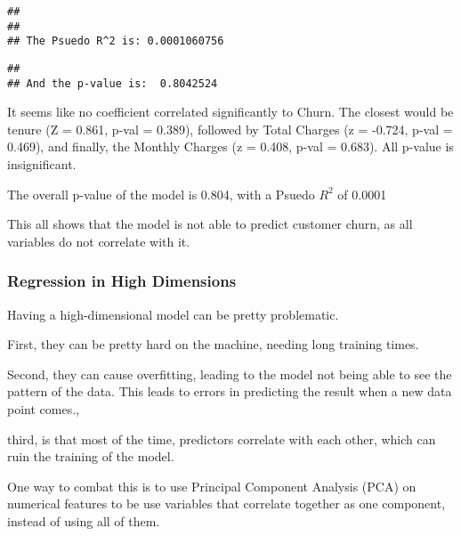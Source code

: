 \documentclass[
]{article}
\newenvironment{Shaded}{\begin{snugshade}}{\end{snugshade}}
\newcommand{\AttributeTok}[1]{\textcolor[rgb]{0.13,0.29,0.53}{#1}}
\newcommand{\DecValTok}[1]{\textcolor[rgb]{0.00,0.00,0.81}{#1}}
\newcommand{\FunctionTok}[1]{\textcolor[rgb]{0.13,0.29,0.53}{\textbf{#1}}}
\newcommand{\NormalTok}[1]{#1}
\newcommand{\SpecialCharTok}[1]{\textcolor[rgb]{0.81,0.36,0.00}{\textbf{#1}}}
\newcommand{\StringTok}[1]{\textcolor[rgb]{0.31,0.60,0.02}{#1}}
\begin{document}
\begin{verbatim}
## 
## 
## The Psuedo R^2 is: 0.0001060756
\end{verbatim}

\begin{Shaded}
\end{Shaded}

\begin{verbatim}
## 
## And the p-value is:  0.8042524
\end{verbatim}

It seems like no coefficient correlated significantly to Churn. The
closest would be tenure (Z = 0.861, p-val = 0.389), followed by Total
Charges (z = -0.724, p-val = 0.469), and finally, the Monthly Charges (z
= 0.408, p-val = 0.683). All p-value is insignificant.

The overall p-value of the model is 0.804, with a Psuedo \(R^2\) of
0.0001

This all shows that the model is not able to predict customer churn, as
all variables do not correlate with it.

\subsubsection{Regression in High
Dimensions}\label{regression-in-high-dimensions}

Having a high-dimensional model can be pretty problematic.

First, they can be pretty hard on the machine, needing long training
times.

Second, they can cause overfitting, leading to the model not being able
to see the pattern of the data. This leads to errors in predicting the
result when a new data point comes.,

third, is that most of the time, predictors correlate with each other,
which can ruin the training of the model.

One way to combat this is to use Principal Component Analysis (PCA) on
numerical features to be use variables that correlate together as one
component, instead of using all of them.
\end{document}

